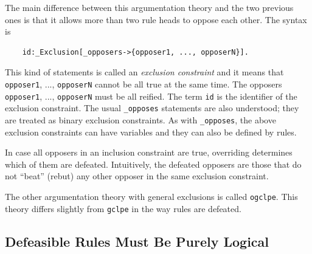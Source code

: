 \documentclass[11pt]{article}
\begin{document}
The main difference between this argumentation theory and the two previous
ones is that it allows more than two rule heads to oppose each other.
The syntax is
\begin{verbatim}
    id:_Exclusion[_opposers->{opposer1, ..., opposerN}].
\end{verbatim}
This kind of statements is called an \emph{exclusion constraint} and it
means that {\tt opposer1}, ..., {\tt opposerN} cannot be all true    
at the same time. The opposers {\tt opposer1}, ..., {\tt opposerN} must be
all reified. The term {\tt id} is the identifier of the
exclusion constraint.
The usual {\tt \_opposes} statements are also understood; they are
treated as binary exclusion constraints.
As with {\tt \_opposes}, the above exclusion constraints can have variables
and they can also be defined by rules.

In case all opposers in an inclusion constraint are true, overriding
determines which of them are defeated.  Intuitively, the defeated opposers
are those that do not ``beat'' (rebut) any other opposer in the same
exclusion constraint.

The other argumentation theory with general exclusions is called
\texttt{ogclpe}. This theory differs slightly from \texttt{gclpe} in the
way rules are defeated.  


\subsection{Defeasible Rules Must Be Purely Logical}
\end{document}
